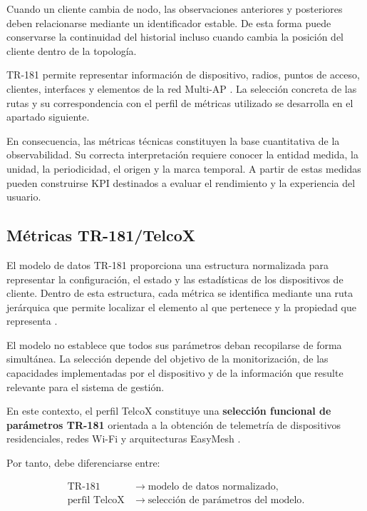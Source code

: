 Cuando un cliente cambia de nodo, las observaciones anteriores y
posteriores deben relacionarse mediante un identificador estable. De esta
forma puede conservarse la continuidad del historial incluso cuando
cambia la posición del cliente dentro de la topología.

TR-181 permite representar información de dispositivo, radios, puntos de
acceso, clientes, interfaces y elementos de la red Multi-AP
\cite{bbf_tr181}. La selección concreta de las rutas y su correspondencia
con el perfil de métricas utilizado se desarrolla en el apartado
siguiente.

En consecuencia, las métricas técnicas constituyen la base cuantitativa
de la observabilidad. Su correcta interpretación requiere conocer la
entidad medida, la unidad, la periodicidad, el origen y la marca temporal.
A partir de estas medidas pueden construirse KPI destinados a evaluar el
rendimiento y la experiencia del usuario.

\subsection{Métricas TR-181/TelcoX}
\label{subsec:metricas-tr181-telcox}

El modelo de datos TR-181 proporciona una estructura normalizada para
representar la configuración, el estado y las estadísticas de los
dispositivos de cliente. Dentro de esta estructura, cada métrica se
identifica mediante una ruta jerárquica que permite localizar el elemento
al que pertenece y la propiedad que representa \cite{bbf_tr181}.

El modelo no establece que todos sus parámetros deban recopilarse de
forma simultánea. La selección depende del objetivo de la monitorización,
de las capacidades implementadas por el dispositivo y de la información
que resulte relevante para el sistema de gestión.

En este contexto, el perfil TelcoX constituye una
\textbf{selección funcional de parámetros TR-181} orientada a la
obtención de telemetría de dispositivos residenciales, redes Wi-Fi y
arquitecturas EasyMesh \cite{telcox_bulkdata}.

Por tanto, debe diferenciarse entre:

\[
\begin{aligned}
    \text{TR-181}
    &\longrightarrow
    \text{modelo de datos normalizado},\\
    \text{perfil TelcoX}
    &\longrightarrow
    \text{selección de parámetros del modelo}.
\end{aligned}
\]


